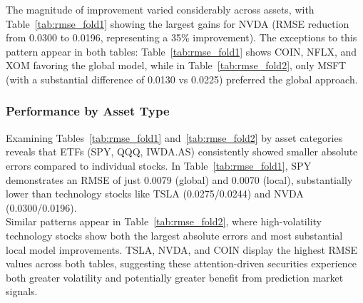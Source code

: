 \documentclass[12pt]{report}
\begin{document}
The magnitude of improvement varied considerably across assets, with Table~\ref{tab:rmse_fold1} showing the largest gains for NVDA (RMSE reduction from 0.0300 to 0.0196, representing a 35\% improvement). The exceptions to this pattern appear in both tables: Table~\ref{tab:rmse_fold1} shows COIN, NFLX, and XOM favoring the global model, while in Table~\ref{tab:rmse_fold2}, only MSFT (with a substantial difference of 0.0130 vs 0.0225) preferred the global approach.

\subsubsection{Performance by Asset Type}
Examining Tables~\ref{tab:rmse_fold1} and~\ref{tab:rmse_fold2} by asset categories reveals that ETFs (SPY, QQQ, IWDA.AS) consistently showed smaller absolute errors compared to individual stocks. In Table~\ref{tab:rmse_fold1}, SPY demonstrates an RMSE of just 0.0079 (global) and 0.0070 (local), substantially lower than technology stocks like TSLA (0.0275/0.0244) and NVDA (0.0300/0.0196).\\

Similar patterns appear in Table~\ref{tab:rmse_fold2}, where high-volatility technology stocks show both the largest absolute errors and most substantial local model improvements. TSLA, NVDA, and COIN display the highest RMSE values across both tables, suggesting these attention-driven securities experience both greater volatility and potentially greater benefit from prediction market signals.
\end{document}

